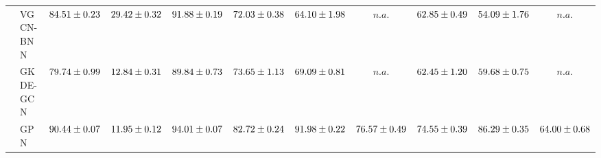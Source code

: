 \begin{table*}[!h]
{\begin{tabular}{ll|cc|cccc|ccc}
        & VGCN-BNN & ${84.51\tiny \pm 0.23}$ & ${29.42\tiny \pm 0.32}$ & ${91.88\tiny \pm 0.19}$ & ${72.03\tiny \pm 0.38}$ & ${64.10\tiny \pm 1.98}$ & $n.a.$ & ${62.85\tiny \pm 0.49}$ & ${54.09\tiny \pm 1.76}$ & $n.a.$\\
        & GKDE-GCN & ${79.74\tiny \pm 0.99}$ & ${12.84\tiny \pm 0.31}$ & ${89.84\tiny \pm 0.73}$ & ${73.65\tiny \pm 1.13}$ & ${69.09\tiny \pm 0.81}$ & $n.a.$ & ${62.45\tiny \pm 1.20}$ & ${59.68\tiny \pm 0.75}$ & $n.a.$\\
        & GPN & ${90.44\tiny \pm 0.07}$ & ${11.95\tiny \pm 0.12}$ & ${94.01\tiny \pm 0.07}$ & ${82.72\tiny \pm 0.24}$ & ${{91.98}\tiny \pm 0.22}$ & ${76.57\tiny \pm 0.49}$ & ${74.55\tiny \pm 0.39}$ & ${{86.29}\tiny \pm 0.35}$ & ${64.00\tiny \pm 0.68}$\\

        \midrule
        

\end{tabular}}
\end{table*}
